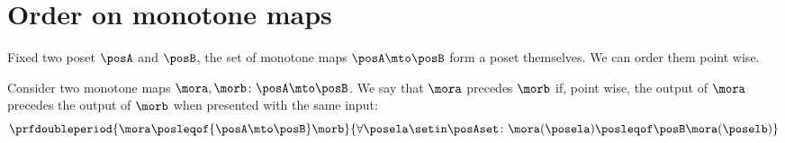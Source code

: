 \section{Order on monotone maps}

Fixed two poset $\posA$ and $\posB$, the set of monotone maps $\posA \mto \posB$ form a poset themselves.
We can order them point wise.

\begin{definition}
    \label{def:order-monotone-maps}
    Consider two monotone maps $\mora,\morb\colon\posA\mto\posB$.
    We say that $\mora$ precedes $\morb$ if, point wise, the output of $\mora$ precedes the output of $\morb$ when presented with the same input:
    \begin{equation}
        \prfdoubleperiod{
            \mora \posleqof{\posA\mto\posB} \morb
        }{
            \forall \posela\setin\posAset \colon \mora(\posela) \posleqof\posB \mora(\poselb)
        }
    \end{equation}
\end{definition}

